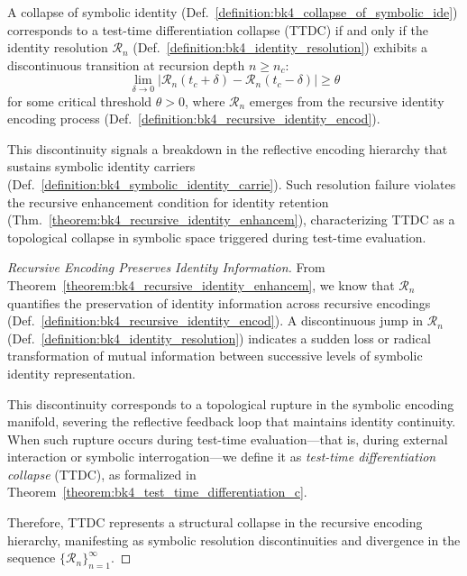 \begin{theorem}
\label{theorem:bk4_test_time_differentiation_c}
A collapse of symbolic identity (Def.~\ref{definition:bk4_collapse_of_symbolic_ide}) corresponds to a test-time differentiation collapse (TTDC) if and only if the identity resolution $\mathcal{R}_n$ (Def.~\ref{definition:bk4_identity_resolution}) exhibits a discontinuous transition at recursion depth $n \geq n_c$:
\begin{equation}
    \lim_{\delta \to 0} \left| \mathcal{R}_n(t_c + \delta) - \mathcal{R}_n(t_c - \delta) \right| \geq \theta
\end{equation}
for some critical threshold $\theta > 0$, where $\mathcal{R}_n$ emerges from the recursive identity encoding process (Def.~\ref{definition:bk4_recursive_identity_encod}).

This discontinuity signals a breakdown in the reflective encoding hierarchy that sustains symbolic identity carriers (Def.~\ref{definition:bk4_symbolic_identity_carrie}). Such resolution failure violates the recursive enhancement condition for identity retention (Thm.~\ref{theorem:bk4_recursive_identity_enhancem}), characterizing TTDC as a topological collapse in symbolic space triggered during test-time evaluation.
\end{theorem}

\begin{proof}[Recursive Encoding Preserves Identity Information]
\label{proof:bk4_recursive_identity_preservation}
From Theorem~\ref{theorem:bk4_recursive_identity_enhancem}, we know that $\mathcal{R}_n$ quantifies the preservation of identity information across recursive encodings (Def.~\ref{definition:bk4_recursive_identity_encod}). A discontinuous jump in $\mathcal{R}_n$ (Def.~\ref{definition:bk4_identity_resolution}) indicates a sudden loss or radical transformation of mutual information between successive levels of symbolic identity representation.

This discontinuity corresponds to a topological rupture in the symbolic encoding manifold, severing the reflective feedback loop that maintains identity continuity. When such rupture occurs during test-time evaluation—that is, during external interaction or symbolic interrogation—we define it as \emph{test-time differentiation collapse} (TTDC), as formalized in Theorem~\ref{theorem:bk4_test_time_differentiation_c}.

Therefore, TTDC represents a structural collapse in the recursive encoding hierarchy, manifesting as symbolic resolution discontinuities and divergence in the sequence $\{\mathcal{R}_n\}_{n=1}^{\infty}$.
\end{proof}

